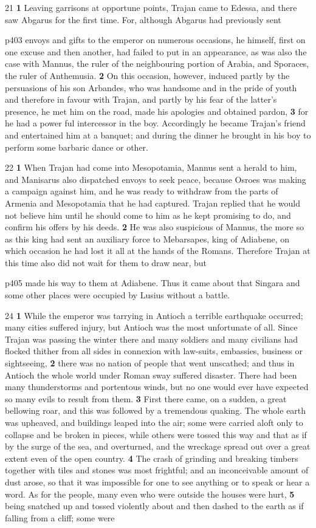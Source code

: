 21
\textbf{1} Leaving garrisons at opportune points, Trajan came to Edessa, and there saw Abgarus for the first time. For, although Abgarus had previously sent

p403 envoys and gifts to the emperor on numerous occasions, he himself, first on one excuse and then another, had failed to put in an appearance, as was also the case with Mannus, the ruler of the neighbouring portion of Arabia, and Sporaces, the ruler of Anthemusia. \textbf{2} On this occasion, however, induced partly by the persuasions of his son Arbandes, who was handsome and in the pride of youth and therefore in favour with Trajan, and partly by his fear of the latter's presence, he met him on the road, made his apologies and obtained pardon, \textbf{3} for he had a power ­ful intercessor in the boy. Accordingly he became Trajan's friend and entertained him at a banquet; and during the dinner he brought in his boy to perform some barbaric dance or other.

22
\textbf{1} When Trajan had come into Mesopotamia, Mannus sent a herald to him, and Manisarus also dispatched envoys to seek peace, because Osroes was making a campaign against him, and he was ready to withdraw from the parts of Armenia and Mesopotamia that he had captured. Trajan replied that he would not believe him until he should come to him as he kept promising to do, and confirm his offers by his deeds. \textbf{2} He was also suspicious of Mannus, the more so as this king had sent an auxiliary force to Mebarsapes, king of Adiabene, on which occasion he had lost it all at the hands of the Romans. Therefore Trajan at this time also did not wait for them to draw near, but

p405 made his way to them at Adiabene. Thus it came about that Singara and some other places were occupied by Lusius without a battle.

24
\textbf{1} While the emperor was tarrying in Antioch a terrible earthquake occurred; many cities suffered injury, but Antioch was the most unfortunate of all. Since Trajan was passing the winter there and many soldiers and many civilians had flocked thither from all sides in connexion with law-suits, embassies, business or sightseeing, \textbf{2} there was no nation of people that went unscathed; and thus in Antioch the whole world under Roman sway suffered disaster. There had been many thunderstorms and portentous winds, but no one would ever have expected so many evils to result from them. \textbf{3} First there came, on a sudden, a great bellowing roar, and this was followed by a tremendous quaking. The whole earth was upheaved, and buildings leaped into the air; some were carried aloft only to collapse and be broken in pieces, while others were tossed this way and that as if by the surge of the sea, and overturned, and the wreckage spread out over a great extent even of the open country. \textbf{4} The crash of grinding and breaking timbers together with tiles and stones was most frightful; and an inconceivable amount of dust arose, so that it was impossible for one to see anything or to speak or hear a word. As for the people, many even who were outside the houses were hurt, \textbf{5} being snatched up and tossed violently about and then dashed to the earth as if falling from a cliff; some were


